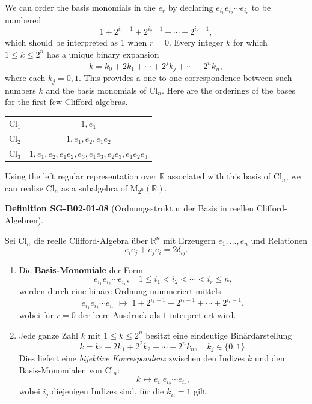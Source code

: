 \documentclass[10pt, letterpaper]{article}
\newcommand{\CustomHeading}[3]{%
  \par\medskip\noindent%
  \textbf{#1 #2} \textnormal{(#3)}.\enskip%
}
\newenvironment{DEF}[2]{\begin{unitbox}\CustomHeading{Definition}{#1}{#2}}{\end{unitbox}}
\begin{document}
We can order the basis monomials in the $e_{r}$ by declaring $e_{i_{1}} e_{i_{2}} \cdots e_{i_{r}}$ to be numbered
$$
1+2^{i_{1}-1}+2^{i_{2}-1}+\cdots+2^{i_{r}-1},
$$
which should be interpreted as 1 when $r=0$. Every integer $k$ for which $1 \leqslant k \leqslant 2^{n}$ has a unique binary expansion
$$
k=k_{0}+2 k_{1}+\cdots+2^{j} k_{j}+\cdots+2^{n} k_{n},
$$
where each $k_{j}=0,1$. This provides a one to one correspondence between such numbers $k$ and the basis monomials of $\mathrm{Cl}_{n}$. Here are the orderings of the bases for the first few Clifford algebras.
\begin{center}
\begin{tabular}{|c|c|}
\hline
$\mathrm{Cl}_{1}$ & $1, e_{1}$ \\
$\mathrm{Cl}_{2}$ & $1, e_{1}, e_{2}, e_{1} e_{2}$ \\
$\mathrm{Cl}_{3}$ & $1, e_{1}, e_{2}, e_{1} e_{2}, e_{3}, e_{1} e_{3}, e_{2} e_{3}, e_{1} e_{2} e_{3}$ \\
\hline
\end{tabular}
\end{center}
Using the left regular representation over $\mathbb{R}$ associated with this basis of $\mathrm{Cl}_{n}$, we can realise $\mathrm{Cl}_{n}$ as a subalgebra of $\mathrm{M}_{2^{n}}(\mathbb{R})$.




\begin{DEF}{SG-B02-01-08}{Ordnungsstruktur der Basis in reellen Clifford-Algebren}
Sei $\mathrm{Cl}_n$ die reelle Clifford-Algebra über $\mathbb{R}^n$ mit Erzeugern
$e_1,\ldots,e_n$ und Relationen
\[
e_i e_j + e_j e_i = 2\delta_{ij}.
\]
\begin{enumerate}
\item
Die \textbf{Basis-Monomiale} der Form
\[
e_{i_1} e_{i_2} \cdots e_{i_r}, \quad 1 \leq i_1 < i_2 < \cdots < i_r \leq n,
\]
werden durch eine binäre Ordnung nummeriert mittels
\[
e_{i_1} e_{i_2} \cdots e_{i_r}
\;\longmapsto\;
1 + 2^{i_1 - 1} + 2^{i_2 - 1} + \cdots + 2^{i_r - 1},
\]
wobei für $r = 0$ der leere Ausdruck als $1$ interpretiert wird.

\item
Jede ganze Zahl $k$ mit $1 \le k \le 2^n$ besitzt eine eindeutige Binärdarstellung
\[
k = k_0 + 2k_1 + 2^2 k_2 + \cdots + 2^n k_n, \quad k_j \in \{0,1\}.
\]
Dies liefert eine \emph{bijektive Korrespondenz} zwischen den Indizes $k$ und den Basis-Monomialen von $\mathrm{Cl}_n$:
\[
k \longleftrightarrow e_{i_1} e_{i_2} \cdots e_{i_r},
\]
wobei $i_j$ diejenigen Indizes sind, für die $k_{i_j} = 1$ gilt.
\end{enumerate}
\end{DEF}
\end{document}
